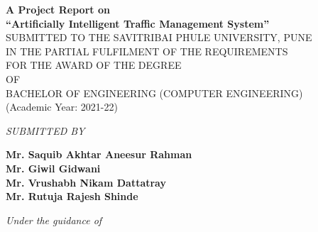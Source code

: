 \documentclass[openany,12pt]{report}
\begin{document}
	\lhead{}
	\chead{}
	\setlength{\headrulewidth}{0.4pt}
	\setlength{\footrulewidth}{0.4pt}
	\fontsize{12}{15}
	\begin{titlepage}
		\begin{center}
			{\bf A Project Report on} \\
			\vspace{0.3in}
			{\Large \bf ``Artificially Intelligent Traffic Management System''}\\
			\vspace{0.3in}
			SUBMITTED TO THE SAVITRIBAI PHULE UNIVERSITY, PUNE\\
			IN THE PARTIAL FULFILMENT OF THE REQUIREMENTS \\
			FOR THE AWARD OF THE DEGREE \\
			\vspace{0.2in}
			OF\\  
			\vspace{0.2in}
			BACHELOR OF ENGINEERING (COMPUTER ENGINEERING)\\
			(Academic Year: 2021-22)\\
			\vspace{0.2in}
			
			{\it SUBMITTED BY}\\
			
			\vspace{0.2in}
			
			{\bf Mr. Saquib Akhtar Aneesur Rahman}\hspace*{\fill}{\bf (Div - B Roll No. 03)}\\
			{\bf Mr. Giwil Gidwani }\hspace*{\fill}{\bf (Div - A Roll No. 24)}\\
			{\bf Mr. Vrushabh Nikam Dattatray     }\hspace*{\fill}{\bf (Div - B Roll No. 50)}\\
			{\bf Mr. Rutuja Rajesh Shinde    }\hspace*{\fill}{\bf (Div - B Roll No. 46)}\\
			
			\vspace{0.4in}
			
			{\it Under the guidance of}\\
			
			\vspace{0.1in}
			

\end{center}
\end{titlepage}
\end{document}
